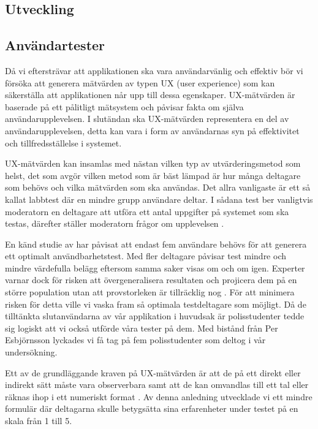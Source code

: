 \documentclass[swedish]{maucsthesis}
\begin{document}
\subsection{Utveckling}


\subsection{Användartester}

Då vi eftersträvar att applikationen ska vara användarvänlig och effektiv bör vi
försöka att generera mätvärden av typen UX (user experience) som kan säkerställa
att applikationen når upp till dessa egenskaper. UX-mätvärden är baserade på ett
pålitligt mätsystem och påvisar fakta om själva användarupplevelsen. I slutändan
ska UX-mätvärden representera en del av användarupplevelsen, detta kan vara i
form av användarnas syn på effektivitet och tillfredsställelse i systemet.

UX-mätvärden kan insamlas med nästan vilken typ av utvärderingsmetod som helst,
det som avgör vilken metod som är bäst lämpad är hur många deltagare som behövs
och vilka mätvärden som ska användas. Det allra vanligaste är ett så kallat
labbtest där en mindre grupp användare deltar. I sådana test ber vanligtvis
moderatorn en deltagare att utföra ett antal uppgifter på systemet som ska
testas, därefter ställer moderatorn frågor om upplevelsen \citep{tullis:2013}.

En känd studie av \citep{nielsen:2000} har påvisat att endast fem användare
behövs för att generera ett optimalt användbarhetstest. Med fler deltagare
påvisar test mindre och mindre värdefulla belägg eftersom samma saker visas om
och om igen. Experter varnar dock för risken att övergeneralisera resultaten och
projicera dem på en större population utan att provstorleken är tillräcklig nog
\citep{tullis:2013}. För att minimera risken för detta ville vi vaska fram så
optimala testdeltagare som möjligt. Då de tilltänkta slutanvändarna av vår
applikation i huvudsak är polisstudenter tedde sig logiskt att vi också
utförde våra tester på dem. Med bistånd från Per Esbjörnsson lyckades vi få tag
på fem polisstudenter som deltog i vår undersökning.

Ett av de grundläggande kraven på UX-mätvärden är att de på ett direkt eller
indirekt sätt måste vara observerbara samt att de kan omvandlas till ett tal
eller räknas ihop i ett numeriskt format \citep{tullis:2013}. Av denna anledning
utvecklade vi ett mindre formulär där deltagarna skulle betygsätta sina
erfarenheter under testet på en skala från 1 till 5.
\end{document}
